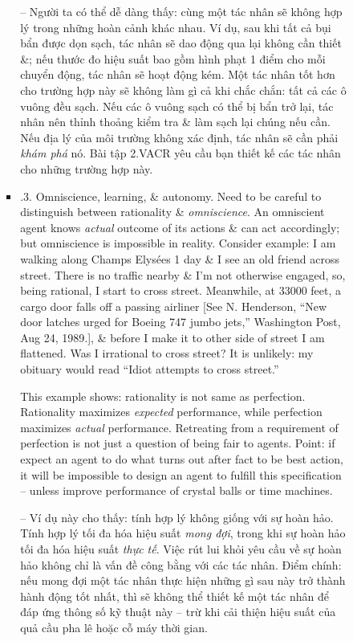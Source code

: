 \documentclass{article}
\begin{document}
\begin{itemize}
\begin{itemize}
\begin{itemize}
\begin{itemize}
				-- Người ta có thể dễ dàng thấy: cùng một tác nhân sẽ không hợp lý trong những hoàn cảnh khác nhau. Ví dụ, sau khi tất cả bụi bẩn được dọn sạch, tác nhân sẽ dao động qua lại không cần thiết \&; nếu thước đo hiệu suất bao gồm hình phạt 1 điểm cho mỗi chuyển động, tác nhân sẽ hoạt động kém. Một tác nhân tốt hơn cho trường hợp này sẽ không làm gì cả khi chắc chắn: tất cả các ô vuông đều sạch. Nếu các ô vuông sạch có thể bị bẩn trở lại, tác nhân nên thỉnh thoảng kiểm tra \& làm sạch lại chúng nếu cần. Nếu địa lý của môi trường không xác định, tác nhân sẽ cần phải {\it khám phá} nó. Bài tập 2.VACR yêu cầu bạn thiết kế các tác nhân cho những trường hợp này.
				\item {.3. Omniscience, learning, \& autonomy.} Need to be careful to distinguish between rationality \& {\it omniscience}. An omniscient agent knows {\it actual} outcome of its actions \& can act accordingly; but omniscience is impossible in reality. Consider example: I am walking along Champs Elysées 1 day \& I see an old friend across street. There is no traffic nearby \& I'm not otherwise engaged, so, being rational, I start to cross street. Meanwhile, at 33000 feet, a cargo door falls off a passing airliner [See {\sc N. Henderson}, ``New door latches urged for Boeing 747 jumbo jets,'' Washington Post, Aug 24, 1989.], \& before I make it to other side of street I am flattened. Was I irrational to cross street? It is unlikely: my obituary would read ``Idiot attempts to cross street.''
				
				This example shows: rationality is not same as perfection. Rationality maximizes {\it expected} performance, while perfection maximizes {\it actual} performance. Retreating from a requirement of perfection is not just a question of being fair to agents. Point: if expect an agent to do what turns out after fact to be best action, it will be impossible to design an agent to fulfill this specification -- unless improve performance of crystal balls or time machines.
				
				-- Ví dụ này cho thấy: tính hợp lý không giống với sự hoàn hảo. Tính hợp lý tối đa hóa hiệu suất {\it mong đợi}, trong khi sự hoàn hảo tối đa hóa hiệu suất {\it thực tế}. Việc rút lui khỏi yêu cầu về sự hoàn hảo không chỉ là vấn đề công bằng với các tác nhân. Điểm chính: nếu mong đợi một tác nhân thực hiện những gì sau này trở thành hành động tốt nhất, thì sẽ không thể thiết kế một tác nhân để đáp ứng thông số kỹ thuật này -- trừ khi cải thiện hiệu suất của quả cầu pha lê hoặc cỗ máy thời gian.
				

\end{itemize}
\end{itemize}
\end{itemize}
\end{itemize}
\end{document}
